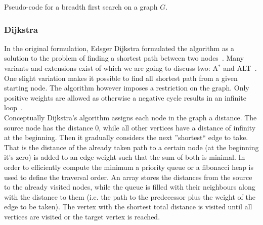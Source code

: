         \begin{algorithm}[htp]
            \hrulealg
        \caption{Pseudo-code for a breadth first search on a graph $G$.}\label{bfs}
        \end{algorithm}
        
        \subsubsection*{Dijkstra} In the original formulation, Edsger Dijkstra formulated the algorithm as a solution to the problem of finding a shortest path between two nodes~\autocite{dijkstra1959note}. 
        Many variants and extensions exist of which we are going to discuss two: A$^*$ and ALT~\autocite{hart1968formal, goldberg2005computing}. 
        One slight variation makes it possible to find all shortest path from a given starting node.
        The algorithm however imposes a restriction on the graph.
        Only positive weights are allowed as otherwise a negative cycle results in an infinite loop~\autocite{cormen2009introduction}. \\
        
        Conceptually Dijkstra's algorithm assigns each node in the graph a distance. 
        The source node has the distance 0, while all other vertices have a distance of infinity at the beginning.
        Then it gradually considers the next ''shortest`` edge to take.
        That is the distance of the already taken path to a certain node (at the beginning it's zero) is added to an edge weight such that the sum of both is minimal. 
        In order to efficiently compute the minimum a priority queue or a fibonacci heap is used to define the traversal order. 
        An array stores the distances from the source to the already visited nodes, while the queue is filled with their neighbours along with the distance to them (i.e. the path to the predecessor plus the weight of the edge to be taken). 
        The vertex with the shortest total distance is visited until all vertices are visited or the target vertex is reached. \\
        
